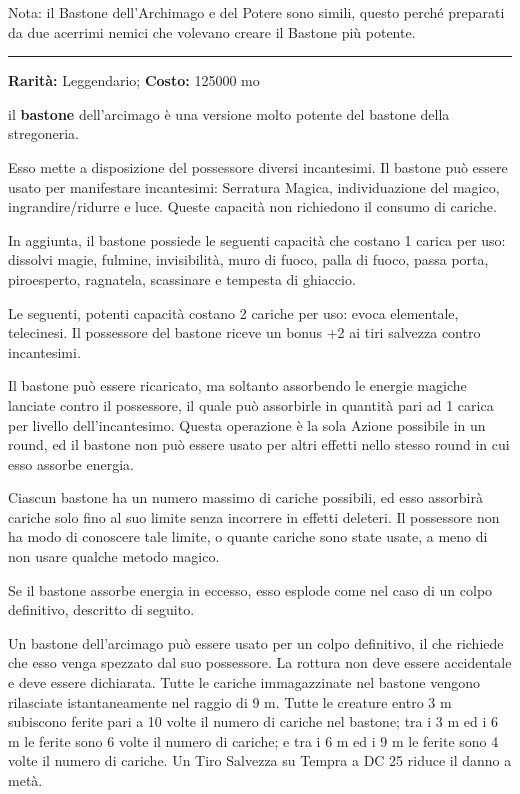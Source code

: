 \begin{multicols}{2}
\medskip

Nota: il Bastone dell'Archimago e del Potere sono simili, questo perché preparati da due acerrimi nemici che volevano creare il Bastone più potente.

\smallskip\noindent\rule{\linewidth}{2pt}  \hypertarget{Bastonedell'Arcimago}{}\medskip{}\noindent\label{Bastonedell'Arcimago}

\textbf{Rarità:} Leggendario; \textbf{Costo:} 125000 mo

il \textbf{bastone} dell'arcimago è una versione molto potente del bastone della stregoneria.

Esso mette a disposizione del possessore diversi incantesimi. Il bastone può essere usato per manifestare incantesimi: Serratura Magica, individuazione del magico, ingrandire/ridurre e luce. Queste capacità non richiedono il consumo di cariche.

In aggiunta, il bastone possiede le seguenti capacità che costano 1 carica per uso: dissolvi magie, fulmine, invisibilità, muro di fuoco, palla di fuoco, passa porta, piroesperto, ragnatela, scassinare e tempesta di ghiaccio.

Le seguenti, potenti capacità costano 2 cariche per uso: evoca elementale, telecinesi. Il possessore del bastone riceve un bonus +2 ai tiri salvezza contro incantesimi.

Il bastone può essere ricaricato, ma soltanto assorbendo le energie magiche lanciate contro il possessore, il quale può assorbirle in quantità pari ad 1 carica per livello dell'incantesimo. Questa operazione è la sola Azione possibile in un round, ed il bastone non può essere usato per altri effetti nello stesso round in cui esso assorbe energia.

Ciascun bastone ha un numero massimo di cariche possibili, ed esso assorbirà cariche solo fino al suo limite senza incorrere in effetti deleteri. Il possessore non ha modo di conoscere tale limite, o quante cariche sono state usate, a meno di non usare qualche metodo magico.

Se il bastone assorbe energia in eccesso, esso esplode come nel caso di un colpo definitivo, descritto di seguito.

Un bastone dell'arcimago può essere usato per un colpo definitivo, il che richiede che esso venga spezzato dal suo possessore. La rottura non deve essere accidentale e deve essere dichiarata. Tutte le cariche immagazzinate nel bastone vengono rilasciate istantaneamente nel raggio di 9 m. Tutte le creature entro 3 m subiscono ferite pari a 10 volte il numero di cariche nel bastone; tra i 3 m ed i 6 m le ferite sono 6 volte il numero di cariche; e tra i 6 m ed i 9 m le ferite sono 4 volte il numero di cariche. Un Tiro Salvezza su Tempra a DC 25 riduce il danno a metà.


\end{multicols}
